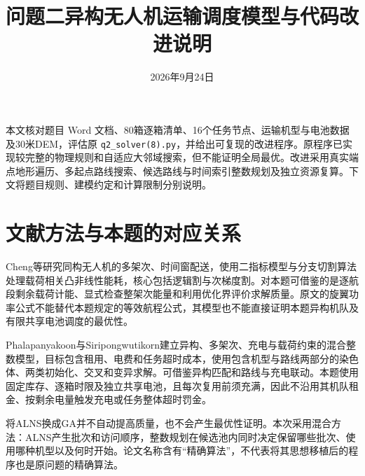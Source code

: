 \documentclass[a4paper,11pt]{article}
\title{问题二异构无人机运输调度模型与代码改进说明}
\author{}\date{2026年9月24日}
\begin{document}
\maketitle
\vspace{-2em}
本文核对题目 Word 文档、80箱逐箱清单、16个任务节点、运输机型与电池数据及30米DEM，评估原 \texttt{q2\_solver(8).py}，并给出可复现的改进程序。原程序已实现较完整的物理规则和自适应大邻域搜索，但不能证明全局最优。改进采用真实端点地形遍历、多起点路线搜索、候选路线与时间索引整数规划及独立资源复算。下文将题目规则、建模约定和计算限制分别说明。

\section{文献方法与本题的对应关系}
Cheng等\cite{Cheng2020}研究同构无人机的多架次、时间窗配送，使用二指标模型与分支切割算法处理载荷相关凸非线性能耗，核心包括逻辑割与次梯度割。对本题可借鉴的是逐航段剩余载荷计能、显式检查整架次能量和利用优化界评价求解质量。原文的旋翼功率公式不能替代本题规定的等效航程公式，其模型也不能直接证明本题异构机队及有限共享电池调度的最优性。

Phalapanyakoon与Siripongwutikorn\cite{Phala2023}建立异构、多架次、充电与载荷约束的混合整数模型，目标包含租用、电费和任务超时成本，使用包含机型与路线两部分的染色体、两类初始化、交叉和变异求解。可借鉴异构匹配和路线与充电联动。本题使用固定库存、逐箱时限及独立共享电池，且每次复用前须充满，因此不沿用其机队租金、按剩余电量触发充电或任务整体超时罚金。

将ALNS换成GA并不自动提高质量，也不会产生最优性证明。本次采用混合方法：ALNS产生批次和访问顺序，整数规划在候选池内同时决定保留哪些批次、使用哪种机型以及何时开始。论文名称含有“精确算法”，不代表将其思想移植后的程序也是原问题的精确算法。
\end{document}
